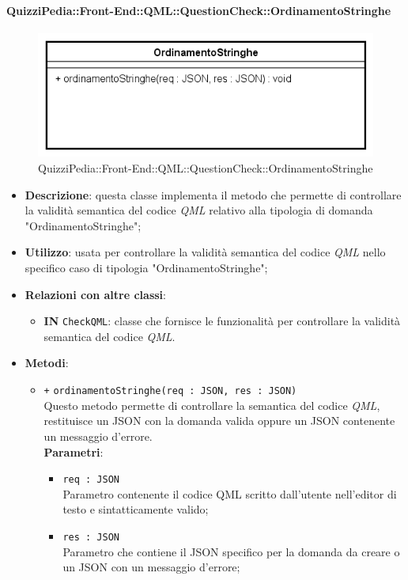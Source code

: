 \paragraph[QuizziPedia::Front-End::QML:: \\ QuestionCheck::OrdinamentoStringhe]{QuizziPedia::Front-End::QML::QuestionCheck::OrdinamentoStringhe}
\begin{figure} [ht]
	\centering
	\includegraphics[scale=0.32]{UML/Classi/Front-End/QuizziPedia_Front-end_QML_QuestionCheck_OrdinamentoStringhe.png}
	\caption{QuizziPedia::Front-End::QML::QuestionCheck::OrdinamentoStringhe}
\end{figure} \FloatBarrier
\begin{itemize}
	\item \textbf{Descrizione}: questa classe implementa il metodo che permette di controllare la validità semantica del codice \textit{QML} relativo alla tipologia di domanda "OrdinamentoStringhe";
	\item \textbf{Utilizzo}: usata per controllare la validità semantica del codice \textit{QML} nello specifico caso di tipologia "OrdinamentoStringhe";
	\item \textbf{Relazioni con altre classi}:
	\begin{itemize}
		\item \textbf{IN} \texttt{CheckQML}: classe che fornisce le funzionalità per controllare la validità semantica del codice \textit{QML}.
	\end{itemize}
	\item \textbf{Metodi}:
	\begin{itemize}
		\item \texttt{+} \texttt{ordinamentoStringhe(req : JSON, res : JSON)} \\
		Questo metodo permette di controllare la semantica del codice \textit{QML}, restituisce un JSON con la domanda valida oppure un JSON contenente un messaggio d'errore. \\
		\textbf{Parametri}:
		\begin{itemize}
			\item \texttt{req : JSON} \\
			Parametro contenente il codice QML scritto dall'utente nell'editor di testo e sintatticamente valido;
			\item \texttt{res : JSON} \\
			Parametro che contiene il JSON specifico per la domanda da creare o un JSON con un messaggio d'errore;
		\end{itemize}
	\end{itemize}
\end{itemize}

